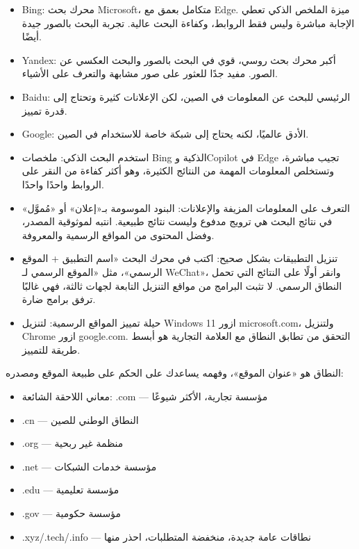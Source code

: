 \begin{itemize}
  \item Bing: محرك بحث Microsoft، متكامل بعمق مع Edge. ميزة الملخص الذكي تعطي الإجابة مباشرة وليس فقط الروابط، وكفاءة البحث عالية. تجربة البحث بالصور جيدة أيضًا.
  \item Yandex: أكبر محرك بحث روسي، قوي في البحث بالصور والبحث العكسي عن الصور. مفيد جدًا للعثور على صور مشابهة والتعرف على الأشياء.
  \item Baidu: الرئيسي للبحث عن المعلومات في الصين، لكن الإعلانات كثيرة وتحتاج إلى قدرة تمييز.
  \item Google: الأدق عالميًا، لكنه يحتاج إلى شبكة خاصة للاستخدام في الصين.
\end{itemize}


\begin{itemize}
  \item استخدم البحث الذكي: ملخصات Bing الذكية وCopilot في Edge تجيب مباشرة، وتستخلص المعلومات المهمة من النتائج الكثيرة، وهو أكثر كفاءة من النقر على الروابط واحدًا واحدًا.
  \item التعرف على المعلومات المزيفة والإعلانات: البنود الموسومة بـ«إعلان» أو «مُموَّل» في نتائج البحث هي ترويج مدفوع وليست نتائج طبيعية. انتبه لموثوقية المصدر، وفضل المحتوى من المواقع الرسمية والمعروفة.
  \item تنزيل التطبيقات بشكل صحيح: اكتب في محرك البحث «اسم التطبيق + الموقع الرسمي»، مثل «الموقع الرسمي لـ WeChat»، وانقر أولًا على النتائج التي تحمل النطاق الرسمي. لا تثبت البرامج من مواقع التنزيل التابعة لجهات ثالثة، فهي غالبًا ترفق برامج ضارة.
  \item حيلة تمييز المواقع الرسمية: لتنزيل Windows 11 ازور microsoft.com، ولتنزيل Chrome ازور google.com. التحقق من تطابق النطاق مع العلامة التجارية هو أبسط طريقة للتمييز.
\end{itemize}


النطاق هو «عنوان الموقع»، وفهمه يساعدك على الحكم على طبيعة الموقع ومصدره:

\begin{itemize}
  \item معاني اللاحقة الشائعة: .com — مؤسسة تجارية، الأكثر شيوعًا
  \item .cn — النطاق الوطني للصين
  \item .org — منظمة غير ربحية
  \item .net — مؤسسة خدمات الشبكات
  \item .edu — مؤسسة تعليمية
  \item .gov — مؤسسة حكومية
  \item .xyz/.tech/.info — نطاقات عامة جديدة، منخفضة المتطلبات، احذر منها
\end{itemize}

